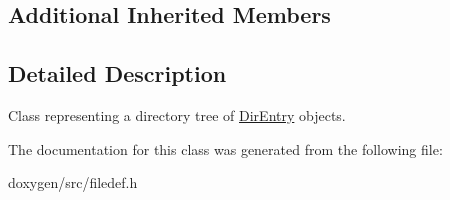 \subsection*{Additional Inherited Members}


\subsection{Detailed Description}
Class representing a directory tree of \mbox{\hyperlink{class_dir_entry}{Dir\+Entry}} objects. 

The documentation for this class was generated from the following file\+:\begin{DoxyCompactItemize}
\item 
doxygen/src/filedef.\+h\end{DoxyCompactItemize}

